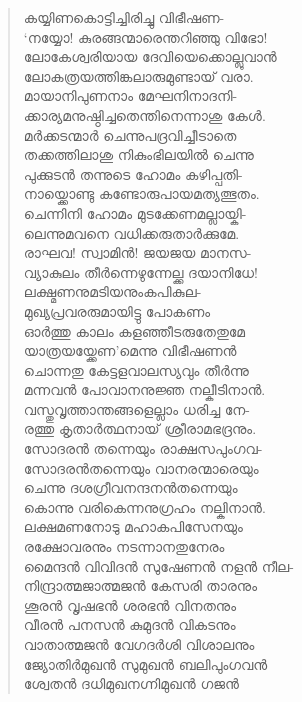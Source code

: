 \begin{verse}
കയ്യിണകൊട്ടിച്ചിരിച്ചു വിഭീഷണ-\\
‘നയ്യോ! കുരങ്ങന്മാരെന്തറിഞ്ഞു വിഭോ!\\
ലോകേശ്വരിയായ ദേവിയെക്കൊല്ലുവാന്‍\\
ലോകത്രയത്തിങ്കലാരുമുണ്ടായ് വരാ.\\
മായാനിപുണനാം മേഘനിനാദനി-\\
ക്കാര്യമനുഷ്ഠിച്ചതെന്തിനെന്നാശു കേള്‍.\\
മര്‍ക്കടന്മാര്‍ ചെന്നുപദ്രവിച്ചീടാതെ\\
തക്കത്തിലാശു നികുംഭിലയില്‍ ചെന്നു\\
പുക്കുടന്‍ തന്നുടെ ഹോമം കഴിപ്പതി-\\
നായ്ക്കൊണ്ടു കണ്ടോരുപായമത്യത്ഭുതം.\\
ചെന്നിനി ഹോമം മുടക്കേണമല്ലായ്കി-\\
ലെന്നുമവനെ വധിക്കരുതാര്‍ക്കുമേ.\\
രാഘവ! സ്വാമിന്‍! ജയജയ മാനസ-\\
വ്യാകുലം തീര്‍ന്നെഴുന്നേല്ക്ക ദയാനിധേ!\\
ലക്ഷ്മണനുമടിയനുംകപികുല-\\
മുഖ്യപ്രവരരുമായിട്ടു പോകണം\\
ഓര്‍ത്തു കാലം കളഞ്ഞീടരുതേതുമേ\\
യാത്രയയ്ക്കേണ’മെന്നു വിഭീഷണന്‍\\
ചൊന്നതു കേട്ടളവാലസ്യവും തീര്‍ന്നു\\
മന്നവന്‍ പോവാനനുജ്ഞ നല്കീടിനാന്‍.\\
വസ്തുവൃത്താന്തങ്ങളെല്ലാം ധരിച്ച നേ-\\
രത്തു കൃതാര്‍ത്ഥനായ് ശ്രീരാമഭദ്രനും.\\
സോദരന്‍ തന്നെയും രാക്ഷസപുംഗവ-\\
സോദരന്‍തന്നെയും വാനരന്മാരെയും\\
ചെന്നു ദശഗ്രീവനന്ദനന്‍തന്നെയും\\
കൊന്നു വരികെന്നനുഗ്രഹം നല്കിനാന്‍.\\
ലക്ഷമണനോടു മഹാകപിസേനയും\\
രക്ഷോവരനും നടന്നാനതുനേരം\\
മൈന്ദന്‍ വിവിദന്‍ സുഷേണന്‍ നളന്‍ നീല-\\
നിന്ദ്രാത്മജാത്മജന്‍ കേസരി താരനും\\
ശൂരന്‍ വൃഷഭന്‍ ശരഭന്‍ വിനതനും\\
വീരന്‍ പനസന്‍ കുമുദന്‍ വികടനും\\
വാതാത്മജന്‍ വേഗദര്‍ശി വിശാലനും\\
ജ്യോതിര്‍മുഖന്‍ സുമുഖന്‍ ബലിപുംഗവന്‍\\
ശ്വേതന്‍ ദധിമുഖനഗ്നിമുഖന്‍ ഗജന്‍\\

\end{verse}

